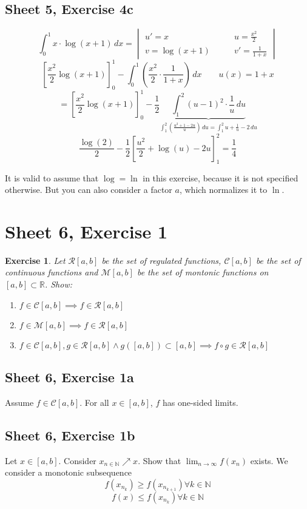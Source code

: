 \documentclass{article}
\newtheorem{ex}{Exercise} %
\begin{document}
\subsection{Sheet 5, Exercise 4c}

\[
  \int_0^1 x \cdot \log(x + 1) \, dx
    = \begin{vmatrix}
      u' = x  \qquad & u = \frac{x^2}{2}   \\
      v = \log(x+1) \qquad & v' = \frac1{1+x}
    \end{vmatrix}
\] \[
  \left[\frac{x^2}{2} \log(x+1)\right]_0^1 - \int_0^1 \left(\frac{x^2}2 \cdot \frac{1}{1+x}\right) \, dx \qquad u(x) = 1 + x
\] \[
  = \left[\frac{x^2}{2} \log(x+1)\right]_0^1 - \frac12 \underbrace{\int_1^2 (u - 1)^2 \cdot \frac1u \, du}_{\int_1^2 \left(\frac{u^2 + 1 - 2u}{u}\right) \, du = \int_1^2 u + \frac1u - 2 \, du}
\] \[
  \frac{\log(2)}{2} - \frac12 \left[\frac{u^2}{2} + \log(u) - 2u\right]_1^2 = \frac14
\]

It is valid to assume that $\log = \ln$ in this exercise, because it is not specified otherwise.
But you can also consider a factor $a$, which normalizes it to $\ln$.

\section{Sheet 6, Exercise 1}
\begin{ex}
  Let $\mathcal R[a,b]$ be the set of regulated functions, $\mathcal C[a,b]$ be the set of continuous functions
  and $\mathcal M[a,b]$ be the set of montonic functions on $[a,b] \subset \mathbb R$. Show:
  \begin{enumerate}
    \item $f \in \mathcal C[a,b] \implies f \in \mathcal R[a,b]$
    \item $f \in \mathcal M[a,b] \implies f \in \mathcal R[a,b]$
    \item $f \in \mathcal C[a,b], g \in \mathcal R[a,b] \land g([a,b]) \subset [a,b] \implies f \circ g \in \mathcal R[a,b]$
  \end{enumerate}
\end{ex}

\subsection{Sheet 6, Exercise 1a}
Assume $f \in \mathcal C[a,b]$.
For all $x \in [a,b]$, $f$ has one-sided limits.

\subsection{Sheet 6, Exercise 1b}
Let $x \in [a,b]$. Consider $x_{n \in \mathbb N} \nearrow x$.
Show that $\lim_{n\to\infty} f(x_n)$ exists.
We consider a monotonic subsequence
\[ f(x_{n_k}) \geq f(x_{n_{k+1}}) \forall k \in \mathbb N \]
\[ f(x) \leq f(x_{n_k}) \forall k \in \mathbb N \]
\end{document}
